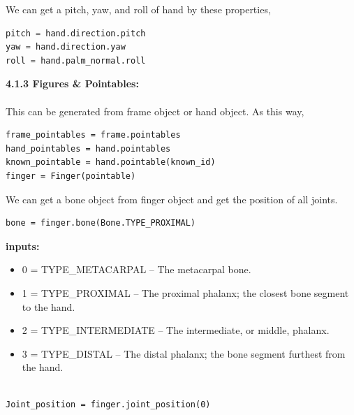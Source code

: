 \documentclass[11pt,a4paper]{article}
\newcommand\tab[1][1cm]{\hspace*{#1}}
\begin{document}
    \vspace{.5cm}
    We can get a pitch, yaw, and roll of hand by these properties,
    \vspace{.5cm}
    \begin{lstlisting}[language=Python, caption=getting pitch\, yaw and roll from hand object]
pitch = hand.direction.pitch
yaw = hand.direction.yaw
roll = hand.palm_normal.roll\end{lstlisting}
\vspace{2cm}
    \textbf{\Large{4.1.3 Figures \& Pointables:}}
	\vspace{0.5cm}\\
	\tab{Fingers are Pointable objects that the Leap Motion software has classified as a finger. Get valid Finger objects from a Frame or a Hand object.}\\
	\vspace{.5cm}
	This can be generated from frame object or hand object. As this way,
	\begin{lstlisting}[caption=getting figures and pointables]
frame_pointables = frame.pointables
hand_pointables = hand.pointables
known_pointable = hand.pointable(known_id)
finger = Finger(pointable)\end{lstlisting}
\vspace{1cm}
\tab{If pointable is detected as the particular figure then and then only it can be returned as finger object. But mostly this pointer is detected as a finger.}
\vspace{.5cm}
We can get a bone object from finger object and get the position of all joints.
	\begin{lstlisting}
bone = finger.bone(Bone.TYPE_PROXIMAL)\end{lstlisting}
\vspace{2cm}
\textbf{inputs:}
\begin{itemize}
    \item 0 = TYPE\_METACARPAL – The metacarpal bone.
    \item 1 = TYPE\_PROXIMAL – The proximal phalanx; the closest bone segment to the hand.
    \item 2 = TYPE\_INTERMEDIATE – The intermediate, or middle, phalanx.
    \item 3 = TYPE\_DISTAL – The distal phalanx; the bone segment furthest from the hand.
\end{itemize}
\vspace{1cm}

\begin{lstlisting}

Joint_position = finger.joint_position(0)
    \end{lstlisting}
\vspace{1cm}
\end{document}
